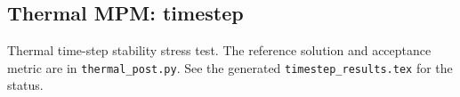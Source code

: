 \subsection{Thermal MPM: timestep}
Thermal time-step stability stress test. The reference solution and acceptance metric are in \texttt{thermal\_post.py}. See the generated \texttt{timestep\_results.tex} for the status.
